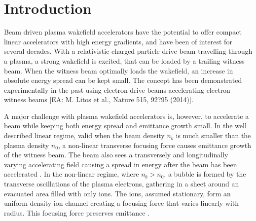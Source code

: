 \documentclass[aps,prstab,reprint,amsmath,amssymb,groupedaddress,onecolumn]{revtex4-1}
\begin{document}
\maketitle

\section{Introduction}\label{S:I}

Beam driven plasma wakefield accelerators \cite{chen:1985} have the potential to offer compact linear accelerators with high energy
gradients, and have been of interest for several decades. With a relativistic charged particle drive
beam travelling through a plasma, a strong wakefield is excited, that can be loaded by a trailing witness beam. When the
witness beam optimally loads the wakefield, an increase in absolute energy spread can be kept small. %
The concept
has been demonstrated experimentally in the past using electron drive beams accelerating electron witness beams
\cite{rosenzweig:1988, blumenfeld:2007, kallos:2008} [EA: M. Litos et al., Nature 515, 92?95 (2014)]. 

A major challenge with plasma wakefield accelerators is, however, to accelerate a beam while keeping both energy spread and
emittance growth small. %
In the well described linear regime, valid when the beam density $n_{b}$ is much smaller than the
plasma density $n_{0}$, a non-linear transverse focusing force causes emittance growth of the witness beam. The beam
also sees a transversely and longitudinally varying accelerating field causing a spread in energy after the beam has
been accelerated \cite{katsouleas:1987}. In the non-linear regime, where $n_{b} > n_{0}$, a bubble is formed by the
transverse oscillations of the plasma electrons, %
gathering in a sheet around an evacuated area filled with only ions. The
ions, assumed stationary, form an uniform density ion channel creating a focusing force that varies linearly with
radius. This %
focusing force %
preserves emittance \cite{rosenzweig:1991}.
\end{document}

